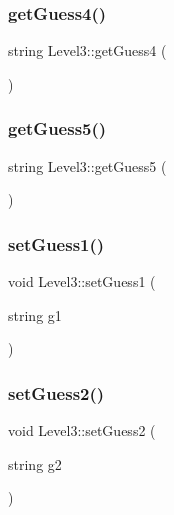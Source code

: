 \mbox{\label{class_level3_a2ec9459557e3ae5b26ab78cdcd0ab948}} 
\subsubsection{getGuess4()}
{\footnotesize\ttfamily string Level3\+::get\+Guess4 (\begin{DoxyParamCaption}{ }\end{DoxyParamCaption})\hspace{0.3cm}{\ttfamily [inline]}}

\mbox{\label{class_level3_a60039199445a7551e77cfa14c90ff378}} 
\subsubsection{getGuess5()}
{\footnotesize\ttfamily string Level3\+::get\+Guess5 (\begin{DoxyParamCaption}{ }\end{DoxyParamCaption})\hspace{0.3cm}{\ttfamily [inline]}}

\mbox{\label{class_level3_a2a7c85c89b4535c3236327f04f17acde}} 
\subsubsection{setGuess1()}
{\footnotesize\ttfamily void Level3\+::set\+Guess1 (\begin{DoxyParamCaption}\item[{string}]{g1 }\end{DoxyParamCaption})\hspace{0.3cm}{\ttfamily [inline]}}

\mbox{\label{class_level3_ac530a153cf356899d70f2302d454f560}} 
\subsubsection{setGuess2()}
{\footnotesize\ttfamily void Level3\+::set\+Guess2 (\begin{DoxyParamCaption}\item[{string}]{g2 }\end{DoxyParamCaption})\hspace{0.3cm}{\ttfamily [inline]}}

